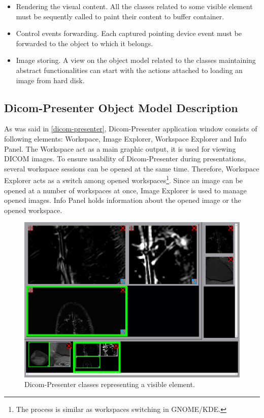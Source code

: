 \begin{itemize}
\item Rendering the visual content. All the classes related to some visible element must be sequently called to paint their content to buffer container.
\item Control events forwarding. Each captured pointing device event must be forwarded to the object to which it belongs.
\item Image storing. A view on the object model related to the classes maintaining abstract functionalities can start with the actions attached to loading an image from hard disk.
\end{itemize}

\subsection{Dicom-Presenter Object Model Description}
As was said in \ref{dicom-presenter}, Dicom-Presenter application window consists of following elements:  Workspace, Image Explorer, Workspace Explorer and Info Panel. The Workspace act as a main graphic output, it is used for viewing DICOM images. To ensure usability of Dicom-Presenter during presentations, several workspace sessions can be opened at the same time. Therefore, Workspace Explorer acts as a switch among opened workspaces\footnote{The process is similar as workspaces switching in GNOME/KDE.}. Since an image can be opened at a number of workspaces at once, Image Explorer is used to manage opened images. Info Panel holds information about the opened image or the opened workspace.

\begin{figure}
	\caption{Dicom-Presenter classes representing a visible element.}
	\begin{center}
	\includegraphics[width=\textwidth]{Text/IMG/dicom-presenter-gui.png}
	\end{center}
	\label{paint}
\end{figure}


